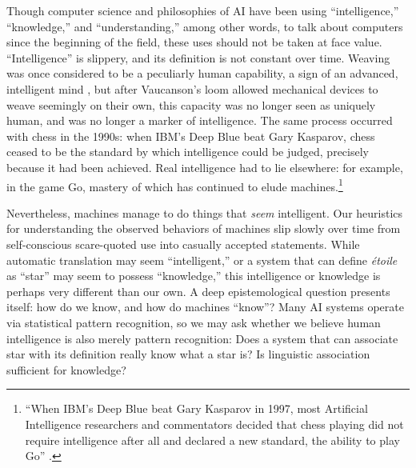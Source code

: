 Though computer science and philosophies of AI have been using
``intelligence,'' ``knowledge,'' and ``understanding,'' among other
words, to talk about computers since the beginning of the field, these
uses should not be taken at face value. ``Intelligence'' is slippery,
and its definition is not constant over time. Weaving was once considered to be a
peculiarly human capability, a sign of an advanced, intelligent
mind \cite[p. 627]{riskinDuck}, but after Vaucanson's loom allowed mechanical devices to weave
seemingly on their own, this capacity was no longer seen as uniquely
human, and was no longer a marker of intelligence. The same process
occurred with chess in the 1990s: when IBM's Deep Blue beat Gary
Kasparov, chess ceased to be the standard by which intelligence could
be judged, precisely because it had been achieved. Real intelligence
had to lie elsewhere: for example, in the game Go, mastery of which
has continued to elude machines.\footnote{``When IBM's Deep Blue beat
  Gary Kasparov in 1997, most Artificial Intelligence researchers and
  commentators decided that chess playing did not require intelligence
  after all and declared a new standard, the ability to play Go'' \cite[p. 623]{riskinDuck}.}

Nevertheless, machines manage to do things that \emph{seem}
intelligent. Our heuristics for understanding the observed 
behaviors of machines slip slowly over time from self-conscious
scare-quoted use into casually accepted statements. While automatic
translation may seem ``intelligent,'' or a system that can define \emph{\'{e}toile}
as ``star'' may seem to possess ``knowledge,'' this intelligence or
knowledge is perhaps very different than our own. A deep
epistemological question presents itself: how do we know, and how do
machines ``know''? Many AI systems operate via statistical pattern
recognition, so we may ask  whether we believe human intelligence is
also merely pattern recognition: Does a system that can associate star
with its definition really know what a star is? Is linguistic
association sufficient for knowledge?


